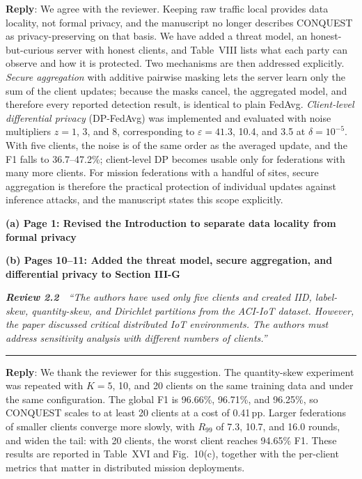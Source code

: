 \documentclass[11pt]{article}
\newcommand{\review}[2]{\par\bigskip\noindent\textbf{\textit{Review #1}}\ \ \textit{``#2''}\par\smallskip\hrule\medskip}
\newcommand{\reply}{\noindent\textbf{Reply}: }
\newcommand{\loc}[1]{\par\medskip\noindent\textbf{#1}\par}
\begin{document}
\reply We agree with the reviewer. Keeping raw traffic local provides data
locality, not formal privacy, and the manuscript no longer describes
CONQUEST as privacy-preserving on that basis. We have added a threat model,
an honest-but-curious server with honest clients, and Table~VIII lists what
each party can observe and how it is protected. Two mechanisms are then
addressed explicitly. \textit{Secure aggregation} with additive pairwise
masking lets the server learn only the sum of the client updates; because the
masks cancel, the aggregated model, and therefore every reported detection
result, is identical to plain FedAvg. \textit{Client-level differential
privacy} (DP-FedAvg) was implemented and evaluated with noise multipliers
$z=1$, 3, and 8, corresponding to $\varepsilon=41.3$, 10.4, and 3.5 at
$\delta=10^{-5}$. With five clients, the noise is of the same order as the
averaged update, and the F1 falls to 36.7--47.2\%; client-level DP becomes
usable only for federations with many more clients. For mission federations
with a handful of sites, secure aggregation is therefore the practical
protection of individual updates against inference attacks, and the
manuscript states this scope explicitly.

\loc{(a) Page 1: Revised the Introduction to separate data locality from formal privacy}

\loc{(b) Pages 10--11: Added the threat model, secure aggregation, and differential privacy to Section III-G}

\review{2.2}{The authors have used only five clients and created IID, label-skew, quantity-skew, and Dirichlet partitions from the ACI-IoT dataset. However, the paper discussed critical distributed IoT environments. The authors must address sensitivity analysis with different numbers of clients.}

\reply We thank the reviewer for this suggestion. The quantity-skew
experiment was repeated with $K=5$, 10, and 20 clients on the same training
data and under the same configuration. The global F1 is 96.66\%, 96.71\%, and
96.25\%, so CONQUEST scales to at least 20 clients at a cost of 0.41\,pp.
Larger federations of smaller clients converge more slowly, with $R_{99}$ of
7.3, 10.7, and 16.0 rounds, and widen the tail: with 20 clients, the worst
client reaches 94.65\% F1. These results are reported in Table~XVI and
Fig.~10(c), together with the per-client metrics that matter in distributed
mission deployments.
\end{document}
